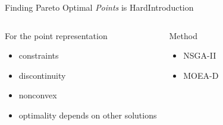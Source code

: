 \begin{frame}{Finding Pareto Optimal {\em Points} is Hard}{Introduction}
\begin{columns}
\begin{block}{}
For the point representation
\begin{itemize}
\item \textcolor{diff-path}{constraints}
\item \textcolor{diff-path}{discontinuity}
\item \textcolor{diff-path}{nonconvex}
\item \textcolor{diff-path}{optimality depends on other solutions}
\end{itemize}
\end{block}

\begin{block}{Method}
	\begin{itemize}
		\item NSGA-II
		\item MOEA-D
	\end{itemize}
\end{block}



\end{columns}
\end{frame}
